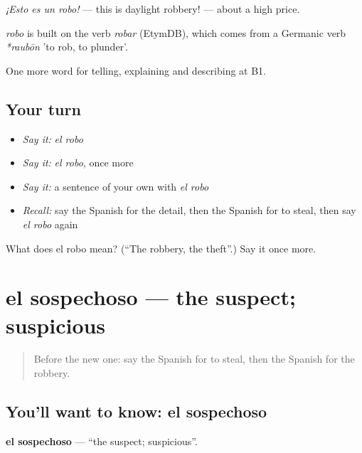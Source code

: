 \emph{¡Esto es un robo!} — this is daylight robbery! — about a high price.

\begin{cousinweb}
\emph{robo} is built on the verb \emph{robar} (EtymDB), which comes from a Germanic verb \emph{*raubōn} 'to rob, to plunder'.
\end{cousinweb}

\begin{grammarlens}[title={What you've built}]
One more word for telling, explaining and describing at B1.
\end{grammarlens}

\subsection*{Your turn}
\begin{itemize}
\raggedright
  \item \emph{Say it:} \emph{el robo}
  \item \emph{Say it:} \emph{el robo}, once more
  \item \emph{Say it:} a sentence of your own with \emph{el robo}
  \item \emph{Recall:} say the Spanish for the detail, then the Spanish for to steal, then say \emph{el robo} again
\end{itemize}

\begin{tcolorbox}[breakable,colback=teal!4,colframe=teal!35!black,title={Before you move on}]
What does el robo mean? (\textquotedblleft{}The robbery, the theft\textquotedblright{}.) Say it once more.
\end{tcolorbox}
\section[el sospechoso]{el sospechoso — the suspect; suspicious}

\label{lesson:ES-C518-sospechoso}



\begin{quote}
Before the new one: say the Spanish for to steal, then the Spanish for the robbery.
\end{quote}

\subsection*{You'll want to know: el sospechoso}
\textbf{el sospechoso} — \textquotedblleft{}the suspect; suspicious\textquotedblright{}.

